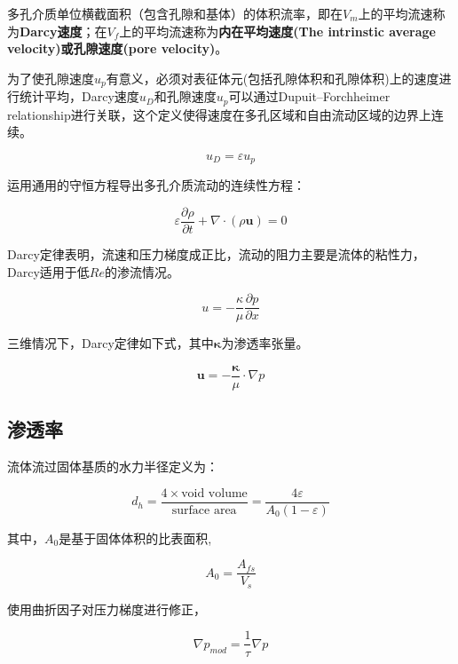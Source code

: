 多孔介质单位横截面积（包含孔隙和基体）的体积流率，即在$ V_m $上的平均流速称为\textbf{Darcy速度}；在$ V_f $上的平均流速称为\textbf{内在平均速度(The intrinstic average velocity)或孔隙速度(pore velocity)}。

为了使孔隙速度$ u_p $有意义，必须对表征体元(包括孔隙体积和孔隙体积)上的速度进行统计平均，Darcy速度$ u_D $和孔隙速度$ u_p $可以通过Dupuit–Forchheimer relationship进行关联，这个定义使得速度在多孔区域和自由流动区域的边界上连续。

\begin{equation}\label{Dupuit–Forchheimer-relationship}
u_{D} = \varepsilon u_p
\end{equation}

运用通用的守恒方程导出多孔介质流动的连续性方程：

\begin{equation}
\varepsilon \frac{\partial \rho}{\partial t} + \nabla\cdot(\rho\bm{u}) = 0
\end{equation}

Darcy定律表明，流速和压力梯度成正比，流动的阻力主要是流体的粘性力，Darcy适用于低$ Re $的渗流情况。

\begin{equation}\label{Darcy's-law-2D}
u = -\frac{\kappa}{\mu} \frac{\partial p}{\partial x}
\end{equation}

三维情况下，Darcy定律如下式，其中$ \bm{\kappa} $为渗透率张量。

\begin{equation}\label{Darcy's-law-3D}
\bm{u} = -\frac{\bm{\kappa}}{\mu}\cdot\nabla p
\end{equation}

\subsection{渗透率}

流体流过固体基质的水力半径定义为：

\begin{equation}
d_h = \frac{4\times\text{void volume}}{\text{surface area}} = \frac{4\varepsilon}{A_0(1-\varepsilon)}
\end{equation}

其中，$ A_0 $是基于固体体积的比表面积,

\[A_0=\frac{A_{fs}}{V_s}\]

使用曲折因子对压力梯度进行修正，

\begin{equation}
\nabla p_{mod} = \frac{1}{\tau}\nabla p
\end{equation}

